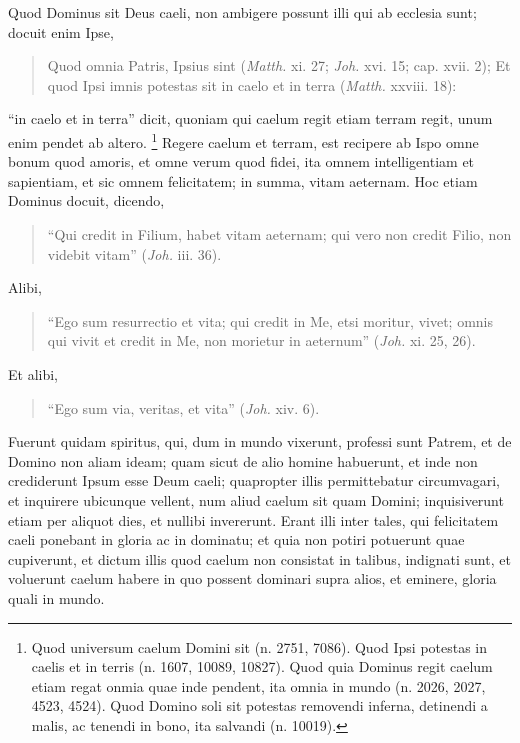 \begin{topic}{5}
    Quod Dominus sit Deus caeli, non ambigere possunt illi qui ab ecclesia sunt; docuit enim Ipse,
    \begin{quote}
        Quod omnia Patris, Ipsius sint (\emph{Matth.} xi. 27; \emph{Joh.} xvi. 15; cap. xvii. 2); Et quod Ipsi imnis
        potestas sit in caelo et in terra (\emph{Matth.} xxviii. 18):
    \end{quote}
    ``in caelo et in terra'' dicit, quoniam qui caelum regit etiam terram regit, unum enim pendet ab altero.
    \footnote{
        Quod universum caelum Domini sit (n. 2751, 7086).
        Quod Ipsi potestas in caelis et in terris (n. 1607, 10089, 10827).
        Quod quia Dominus regit caelum etiam regat onmia quae inde pendent, ita omnia in mundo (n. 2026, 2027, 4523,
        4524).
        Quod Domino soli sit potestas removendi inferna, detinendi a malis, ac tenendi in bono, ita salvandi (n.
        10019).
    }
    Regere caelum et terram, est recipere ab Ispo omne bonum quod amoris, et omne verum quod fidei, ita omnem
    intelligentiam et sapientiam, et sic omnem felicitatem; in summa, vitam aeternam.
    Hoc etiam Dominus docuit, dicendo,
    \begin{quote}
        ``Qui credit in Filium, habet vitam aeternam; qui vero non credit Filio, non videbit vitam'' (\emph{Joh.} iii.
        36).
    \end{quote}
    Alibi,
    \begin{quote}
        ``Ego sum resurrectio et vita; qui credit in Me, etsi moritur, vivet; omnis qui vivit et credit in Me, non
        morietur in aeternum'' (\emph{Joh.} xi. 25, 26).
    \end{quote}
    Et alibi,
    \begin{quote}
        ``Ego sum via, veritas, et vita'' (\emph{Joh.} xiv. 6).
    \end{quote}
\end{topic}

\begin{topic}{6}
    Fuerunt quidam spiritus, qui, dum in mundo vixerunt, professi sunt Patrem, et de Domino non aliam ideam; quam sicut
    de alio homine habuerunt, et inde non crediderunt Ipsum esse Deum caeli; quapropter illis permittebatur
    circumvagari, et inquirere ubicunque vellent, num aliud caelum sit quam Domini; inquisiverunt etiam per aliquot
    dies, et nullibi invererunt.
    Erant illi inter tales, qui felicitatem caeli ponebant in gloria ac in dominatu; et quia non potiri potuerunt quae
    cupiverunt, et dictum illis quod caelum non consistat in talibus, indignati sunt, et voluerunt caelum habere in quo
    possent dominari supra alios, et eminere, gloria quali in mundo.
\end{topic}

